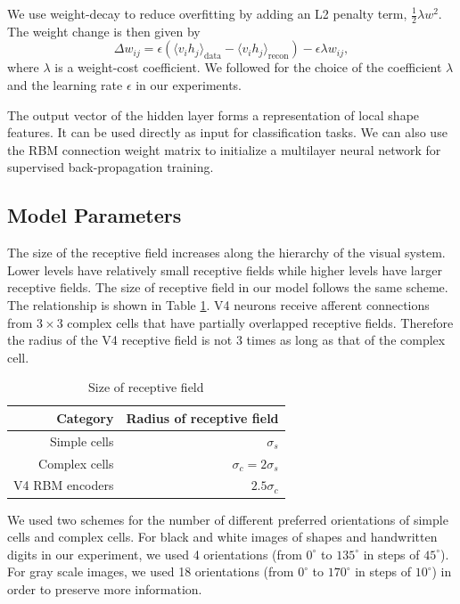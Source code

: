\documentclass[10pt]{article}
\begin{document}
We use weight-decay \cite{hinton2010}
to reduce overfitting by adding an L2 penalty term, $\frac{1}{2}\lambda w^2$.
The weight change is then given by
\begin{equation}
\Delta w_{ij}=\epsilon\left(\langle v_i h_j\rangle_\text{data}-\langle v_i h_j\rangle_\text{recon}\right)
-\epsilon\lambda w_{ij},
\end{equation}
where $\lambda$ is a weight-cost coefficient.
We followed \cite{hinton2010} for the choice of the coefficient $\lambda$ and the learning rate $\epsilon$
in our experiments.

The output vector of the hidden layer forms a representation of local shape features.
It can be used directly as input for classification tasks.
We can also use the RBM connection weight matrix to initialize a multilayer neural network
for supervised back-propagation training.

\subsection{Model Parameters}

The size of the receptive field increases along the hierarchy of the visual system.
Lower levels have relatively small receptive fields while higher levels have larger receptive fields.
The size of receptive field in our model follows the same scheme.
The relationship is shown in Table \ref{tab:1}.
V4 neurons receive afferent connections from $3\times3$ complex cells
that have partially overlapped receptive fields.
Therefore the radius of the V4 receptive field is not 3 times as long as that of the complex cell.

\begin{table}[h]
\caption{Size of receptive field}
\centering
\begin{tabular}{rr}
\toprule
Category & Radius of receptive field \\
\midrule
Simple cells & $\sigma_s$ \\
Complex cells & $\sigma_c = 2\sigma_s$ \\
V4 RBM encoders & $2.5\sigma_c$\\
\bottomrule
\end{tabular}
\label{tab:1}
\end{table}

We used two schemes for the number of different preferred orientations of simple cells and complex cells.
For black and white images of shapes and handwritten digits in our experiment,
we used 4 orientations (from $0^\circ$ to $135^\circ$ in steps of $45^\circ$).
For gray scale images, we used 18 orientations (from $0^\circ$ to $170^\circ$ in steps of $10^\circ$)
in order to preserve more information.
\end{document}
